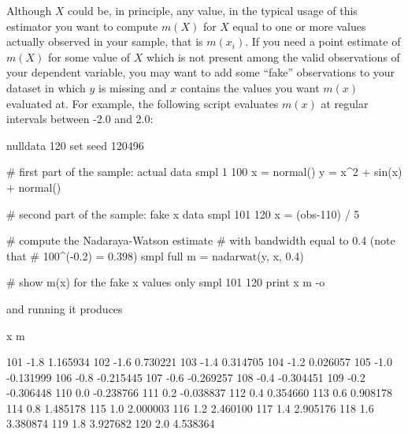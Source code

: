 Although $X$ could be, in principle, any value, in the typical usage
of this estimator you want to compute $m(X)$ for $X$ equal to one or
more values actually observed in your sample, that is $m(x_i)$. If you
need a point estimate of $m(X)$ for some value of $X$ which is not
present among the valid observations of your dependent variable, you
may want to add some ``fake'' observations to your dataset in which
$y$ is missing and $x$ contains the values you want $m(x)$ evaluated
at. For example, the following script evaluates $m(x)$ at regular
intervals between -2.0 and 2.0:

\begin{code}
nulldata 120
set seed 120496

# first part of the sample: actual data
smpl 1 100
x = normal()
y = x^2 + sin(x) + normal()

# second part of the sample: fake x data
smpl 101 120
x = (obs-110) / 5

# compute the Nadaraya-Watson estimate
# with bandwidth equal to 0.4 (note that
# 100^(-0.2) = 0.398)
smpl full
m = nadarwat(y, x, 0.4)

# show m(x) for the fake x values only
smpl 101 120
print x m -o
\end{code}

and running it produces
\begin{code}
               x            m

101         -1.8     1.165934
102         -1.6     0.730221
103         -1.4     0.314705
104         -1.2     0.026057
105         -1.0    -0.131999
106         -0.8    -0.215445
107         -0.6    -0.269257
108         -0.4    -0.304451
109         -0.2    -0.306448
110          0.0    -0.238766
111          0.2    -0.038837
112          0.4     0.354660
113          0.6     0.908178
114          0.8     1.485178
115          1.0     2.000003
116          1.2     2.460100
117          1.4     2.905176
118          1.6     3.380874
119          1.8     3.927682
120          2.0     4.538364
\end{code}



